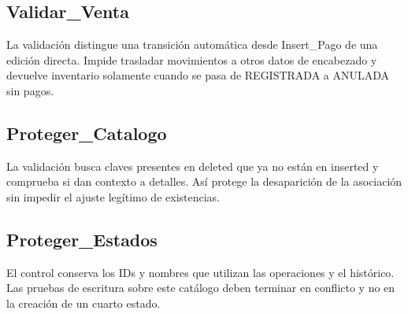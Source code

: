 \documentclass[10pt,letterpaper]{article}
\begin{document}
\par\medskip\noindent\begin{minipage}{\textwidth}\subsection{Validar\_Venta}

La validación distingue una transición automática desde Insert\_Pago de una edición directa. Impide trasladar movimientos a otros datos de encabezado y devuelve inventario solamente cuando se pasa de REGISTRADA a ANULADA sin pagos.



\end{minipage}\par\medskip

\par\medskip\noindent\begin{minipage}{\textwidth}\subsection{Proteger\_Catalogo}

La validación busca claves presentes en deleted que ya no están en inserted y comprueba si dan contexto a detalles. Así protege la desaparición de la asociación sin impedir el ajuste legítimo de existencias.



\end{minipage}\par\medskip

\par\medskip\noindent\begin{minipage}{\textwidth}\subsection{Proteger\_Estados}

El control conserva los IDs y nombres que utilizan las operaciones y el histórico. Las pruebas de escritura sobre este catálogo deben terminar en conflicto y no en la creación de un cuarto estado.



\end{minipage}\par\medskip
\end{document}
